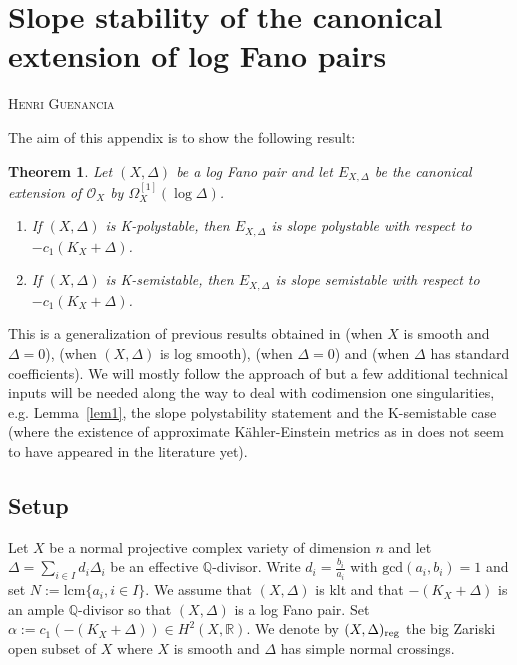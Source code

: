 \documentclass[12pt]{amsart}
\newtheorem{thm}[prop]{Theorem}
\theoremstyle{definition}
\newcommand{\cO}{\mathcal{O}}
\numberwithin{equation}{section}
\newcommand{\R}{\mathbb R}
\newcommand{\Q}{\mathbb Q}
\begin{document}
\clearpage
\appendix
\setcounter{section}{1}

\section{Slope stability of the canonical extension of log Fano pairs} \label{s:can ext ss}

\centerline{\small{\textsc{Henri Guenancia}}}

\medskip

The aim of this appendix is to show the following result:

\begin{thm}
\label{thm:can ext appendix}
Let $(X,\Delta)$ be a log Fano pair and let $E_{X,\Delta}$ be the canonical extension of $\cO_X$ by $\Omega_X^{[1]}(\log \Delta)$.
\begin{enumerate}
\item If $(X,\Delta)$ is K-polystable, then $E_{X,\Delta}$ is slope polystable with respect to $-c_1(K_X+\Delta)$.
\item If $(X,\Delta)$ is K-semistable, then $E_{X,\Delta}$ is slope semistable with respect to $-c_1(K_X+\Delta)$.
\end{enumerate}
\end{thm}

This is a generalization of previous results obtained in \cite{Tian-extension} (when $X$ is smooth and $\Delta=0$), \cite{Li-extension-stab} (when $(X,\Delta)$ is log smooth), \cite{DGP-Q-Fano-decomp} (when $\Delta=0$) and \cite{Dai-stability} (when $\Delta$ has standard coefficients). We will mostly follow the approach of \cite{DGP-Q-Fano-decomp} but a few additional technical inputs will be needed along the way to deal with codimension one singularities, e.g. Lemma~\ref{lem1}, the slope polystability statement and the K-semistable case (where the existence of approximate K\"ahler-Einstein metrics as in \cite{Li-valuative-criterion} does not seem to have appeared in the literature yet).

\subsection{Setup}

Let $X$ be a normal projective complex variety of dimension $n$ and let $\Delta=\sum_{i\in I} d_i\Delta_i$ be an effective $\mathbb Q$-divisor. Write $d_i=\frac{b_i}{a_i}$ with $\mathrm{gcd}(a_i,b_i)=1$ and set $N:=\mathrm{lcm}\{a_i, i\in I\}$. We assume that $(X,\Delta)$ is klt and that $-(K_X+\Delta)$ is an ample $\Q$-divisor so that $(X,\Delta)$ is a log Fano pair. Set $\alpha:=c_1(-(K_X+\Delta))\in H^2(X,\R)$. We denote by $(X,\Delta)_{\rm reg}$ the big Zariski open subset of $X$ where $X$ is smooth and $\Delta$ has simple normal crossings. \\
\end{document}
